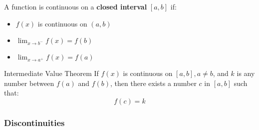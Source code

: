 \documentclass{MathNotes}
\begin{document}
A function is continuous on a \textbf{closed interval} $[a, b]$ if:
\begin{itemize}
    \item $f(x)$ is continuous on $(a, b)$
    \item $\lim_{x\to b^-}f(x)=f(b)$
    \item $\lim_{x\to a^+}f(x)=f(a)$
\end{itemize}

\begin{theorem}{Intermediate Value Theorem}
    If $f(x)$ is continuous on $[a, b], a\neq b$, and $k$ is any number
    between $f(a)$ and $f(b)$, then there exists a number $c$ in
    $[a, b]$ such that: $$f(c)=k$$
\end{theorem}

\subsubsection{Discontinuities}
\end{document}
